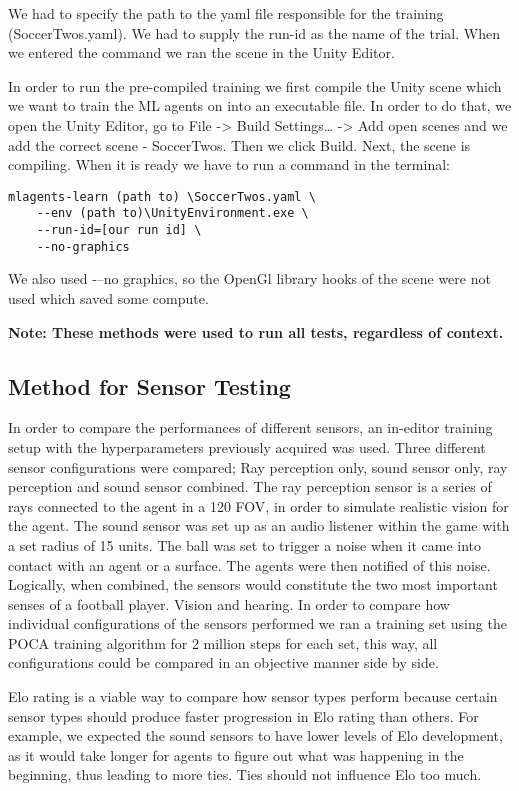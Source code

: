 \documentclass{LSkill}
\begin{document}
We had to specify the path to the yaml file responsible for the training (SoccerTwos.yaml). We had to supply the run-id as the name of the trial. When we entered the command we ran the scene in the Unity Editor.

In order to run the pre-compiled training we first compile the Unity scene which we want to train the ML agents on into an executable file. In order to do that, we open the Unity Editor, go to File -> Build Settings… -> Add open scenes and we add the correct scene - SoccerTwos. Then we click Build. Next, the scene is compiling. When it is ready we have to run a command in the terminal: 
\begin{verbatim}    
mlagents-learn (path to) \SoccerTwos.yaml \
    --env (path to)\UnityEnvironment.exe \
    --run-id=[our run id] \
    --no-graphics
\end{verbatim}
We also used -–no graphics, so the OpenGl library hooks of the scene were not used which saved some compute.

\textbf{Note: These methods were used to run all tests, regardless of context.}

\subsection{Method for Sensor Testing}
In order to compare the performances of different sensors, an in-editor training setup with the hyperparameters previously acquired was used. Three different sensor configurations were compared; Ray perception only, sound sensor only, ray perception and sound sensor combined. The ray perception sensor is a series of rays connected to the agent in a 120 FOV, in order to simulate realistic vision for the agent. The sound sensor was set up as an audio listener within the game with a set radius of 15 units. The ball was set to trigger a noise when it came into contact with an agent or a surface. The agents were then notified of this noise. Logically, when combined, the sensors would constitute the two most important senses of a football player. Vision and hearing. In order to compare how individual configurations of the sensors performed we ran a training set using the POCA training algorithm for 2 million steps for each set, this way, all configurations could be compared in an objective manner side by side. 

Elo rating is a viable way to compare how sensor types perform because certain sensor types should produce faster progression in Elo rating than others. For example, we expected the sound sensors to have lower levels of Elo development, as it would take longer for agents to figure out what was happening in the beginning, thus leading to more ties. Ties should not influence Elo too much.
\end{document}
